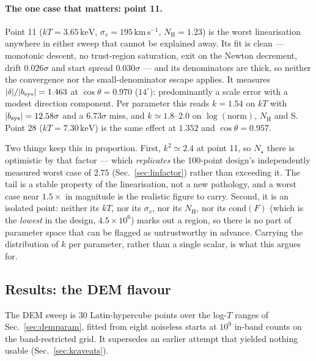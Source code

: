 \documentclass[11pt,a4paper]{article}
\newcommand{\nh}{N_{\mathrm{H}}}
\newcommand{\kev}{\,\mathrm{keV}}
\newcommand{\kms}{\,\mathrm{km\,s^{-1}}}
\begin{document}
\paragraph{The one case that matters: point 11.} Point 11
($kT=3.65\kev$, $\sigma_v=195\kms$, $\nh=1.23$) is the worst linearisation
anywhere in either sweep that cannot be explained away. Its fit is clean ---
monotonic descent, no trust-region saturation, exit on the Newton decrement,
drift $0.026\sigma$ and start spread $0.030\sigma$ --- and its denominators are
thick, so neither the convergence nor the small-denominator escape applies. It
measures $|\delta|/|b_{\rm sys}| = 1.463$ at $\cos\theta = 0.970$
($14^\circ$): predominantly a scale error with a modest direction component.
Per parameter this reads $k=1.54$ on $kT$ with $|b_{\rm sys}| = 12.58\sigma$
and a $6.73\sigma$ miss, and $k\simeq1.8$--$2.0$ on $\log(\text{norm})$, $\nh$
and S. Point 28 ($kT=7.30\kev$) is the same effect at $1.352$ and
$\cos\theta=0.957$.

Two things keep this in proportion. First, $k^2\simeq2.4$ at point 11, so
$N_\star$ there is optimistic by that factor --- which \emph{replicates} the
100-point design's independently measured worst case of $2.75$
(Sec.~\ref{sec:linfactor}) rather than exceeding it. The tail is a stable
property of the linearisation, not a new pathology, and a worst case near
$1.5\times$ in magnitude is the realistic figure to carry. Second, it is an
isolated point: neither its $kT$, nor its $\sigma_v$, nor its $\nh$, nor its
$\mathrm{cond}(F)$ (which is the \emph{lowest} in the design, $4.5\times10^6$)
marks out a region, so there is no part of parameter space that can be flagged
as untrustworthy in advance. Carrying the distribution of $k$ per parameter,
rather than a single scalar, is what this argues for.

\subsection{Results: the DEM flavour}\label{sec:kdem}
The DEM sweep is 30 Latin-hypercube points over the log-$T$ ranges of
Sec.~\ref{sec:demparam}, fitted from eight noiseless starts at $10^9$ in-band
counts on the band-restricted grid. It supersedes an earlier attempt that
yielded nothing usable (Sec.~\ref{sec:kcaveats}).
\end{document}
